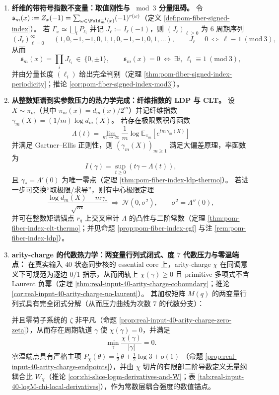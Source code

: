 \begin{theorem}
\begin{enumerate}
  \item \textbf{纤维的带符号指数不变量：取值刚性与 \texorpdfstring{$\bmod 3$}{mod 3} 分量阻碍。}
  令 \(\mathfrak{s}_m(x):=Z_x(-1)=\sum_{\omega\in\Fold_m^{-1}(x)}(-1)^{r(\omega)}\)（定义 \ref{def:pom-fiber-signed-index}）。
  若 \(\Gamma_x\simeq\bigsqcup_i P_{\ell_i}\) 并记 \(J_\ell:=I_\ell(-1)\)，则 \((J_\ell)_{\ell\ge 0}\) 为 \(6\) 周期序列
  \[
  (J_\ell)_{\ell=0}^{\infty}=(1,0,-1,-1,0,1,1,0,-1,-1,0,1,\dots),
  \qquad
  J_\ell=0\ \Longleftrightarrow\ \ell\equiv 1\ (\mathrm{mod}\ 3),
  \]
  从而
  \[
  \mathfrak{s}_m(x)=\prod_i J_{\ell_i}\ \in\ \{0,\pm 1\},
  \qquad
  \mathfrak{s}_m(x)=0\ \Longleftrightarrow\ \exists i,\ \ell_i\equiv 1\ (\mathrm{mod}\ 3),
  \]
  并由分量长度 \((\ell_i)\) 给出完全判别（定理 \ref{thm:pom-fiber-signed-index-periodicity}；推论 \ref{cor:pom-fiber-signed-index-mod3}）。

  \item \textbf{从整数矩谱到实参数压力的热力学完成：纤维指数的 LDP 与 CLT。}
  设 \(X\sim\pi_m\)（其中 \(\pi_m(x)=d_m(x)/2^m\)）并记纤维指数 \(\gamma_m(X)=(1/m)\log d_m(X)\)。
  若存在极限累积母函数
  \[
  \Lambda(t)=\lim_{m\to\infty}\frac{1}{m}\log \mathbb{E}_{\pi_m}\!\left[e^{t m\,\gamma_m(X)}\right]
  \]
  并满足 Gartner--Ellis 正则性，则 \((\gamma_m(X))_{m\ge 1}\) 满足大偏差原理，率函数为
  \[
  I(\gamma)=\sup_{t\ge 0}(t\gamma-\Lambda(t)),
  \]
  且 \(\gamma_\ast=\Lambda'(0)\) 为唯一零点（定理 \ref{thm:pom-fiber-index-ldp-thermo}）。
  若进一步可交换“取极限/求导”，则有中心极限定理
  \[
  \frac{\log d_m(X)-m\gamma_\ast}{\sqrt m}\ \Longrightarrow\ \mathcal N(0,\sigma^2),
  \qquad \sigma^2=\Lambda''(0),
  \]
  并可在整数矩谱锚点 \(r_q\) 上交叉审计 \(\Lambda\) 的凸性与二阶常数（定理 \ref{thm:pom-fiber-index-clt-thermo}；并见命题 \ref{prop:pom-fiber-index-cgf} 与注 \ref{rem:pom-fiber-index-ldp}）。

  \item \textbf{arity-charge 的代数热力学：两变量行列式闭式、度 \(7\) 代数压力与零温端点：}
  在真实输入 \(40\) 状态同步核的 essential core 上，arity-charge \(\chi\) 在同调意义下可规范为逐边 \(0/1\) 指示，从而闭轨上 \(\chi(\gamma)\ge 0\) 且 primitive 多项式不含 Laurent 负幂（定理 \ref{thm:real-input-40-arity-charge-coboundary}；推论 \ref{cor:real-input-40-arity-charge-no-laurent}）。
  其加权矩阵 \(M(q)\) 的两变量行列式具有完全闭式分解（从而压力曲线为次数 \(7\) 的代数分支）：
  
  并且零荷子系统的 \(\zeta\) 非平凡（命题 \ref{prop:real-input-40-arity-charge-zero-zeta}），从而存在周期轨道 \(\gamma\) 使 \(\chi(\gamma)=0\)，并满足
  \[
  \min_{\gamma}\frac{\chi(\gamma)}{|\gamma|}=0.
  \]
  零温端点具有严格主项
  \(
  P_\chi(\theta)=\tfrac12\,\theta+\tfrac12\log 3+o(1)
  \)
  （命题 \ref{prop:real-input-40-arity-charge-endpoints}），并由 \(\chi\) 切片的有限部二阶导数定义无量纲耦合比
  \(W_\chi\)（推论 \ref{cor:chi-slice-logm-derivatives-and-W}；表 \ref{tab:real-input-40-logM-chi-local-derivatives}），作为常数层耦合强度的数值锚点。


\end{enumerate}
\end{theorem}
